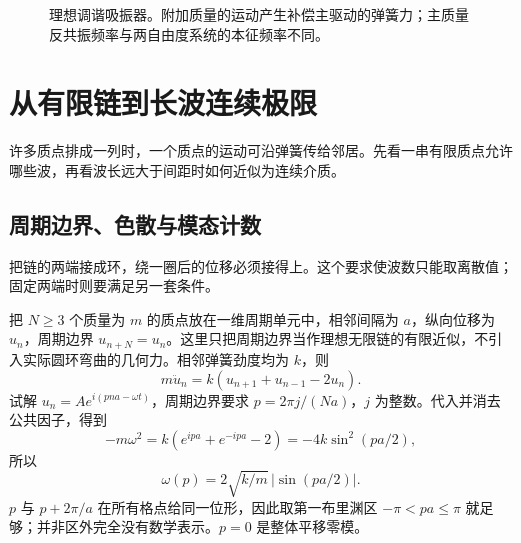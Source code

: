 \begin{figure}[htbp]
\centering
{}
\caption{理想调谐吸振器。附加质量的运动产生补偿主驱动的弹簧力；主质量反共振频率与两自由度系统的本征频率不同。}
\label{fig:osc-absorber}
\end{figure}


\section{从有限链到长波连续极限}
许多质点排成一列时，一个质点的运动可沿弹簧传给邻居。先看一串有限质点允许哪些波，再看波长远大于间距时如何近似为连续介质。

\subsection{周期边界、色散与模态计数}
把链的两端接成环，绕一圈后的位移必须接得上。这个要求使波数只能取离散值；固定两端时则要满足另一套条件。

把 $N\ge3$ 个质量为 $m$ 的质点放在一维周期单元中，相邻间隔为 $a$，纵向位移为 $u_n$，周期边界 $u_{n+N}=u_n$。这里只把周期边界当作理想无限链的有限近似，不引入实际圆环弯曲的几何力。相邻弹簧劲度均为 $k$，则
\begin{equation}
m\ddot u_n=k(u_{n+1}+u_{n-1}-2u_n).
\label{eq:chain-eq}
\end{equation}
试解 $u_n=Ae^{i(pna-\omega t)}$，周期边界要求 $p=2\pi j/(Na)$，$j$ 为整数。代入并消去公共因子，得到
\[
-m\omega^2=k(e^{ipa}+e^{-ipa}-2)=-4k\sin^2(pa/2),
\]
所以
\begin{equation}
\omega(p)=2\sqrt{k/m}\,|\sin(pa/2)|.
\label{eq:dispersion-chain}
\end{equation}
$p$ 与 $p+2\pi/a$ 在所有格点给同一位形，因此取第一布里渊区 $-\pi<pa\le\pi$ 就足够；并非区外完全没有数学表示。$p=0$ 是整体平移零模。

